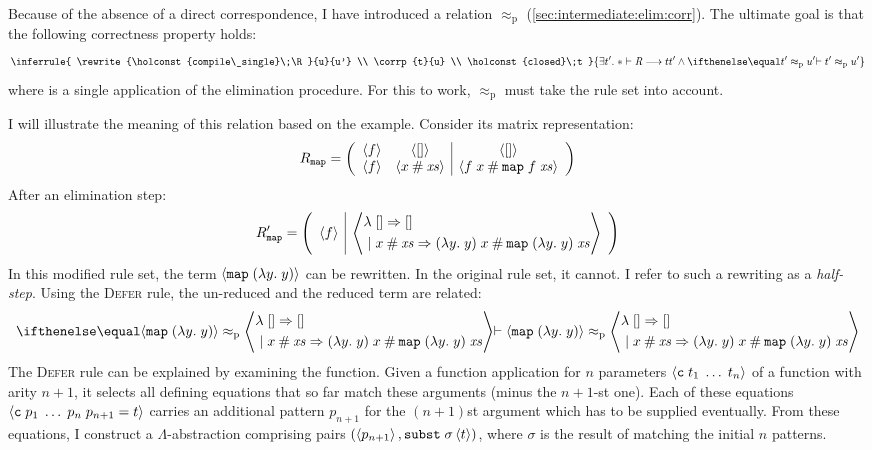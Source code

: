 Because of the absence of a direct correspondence, I have introduced a relation $\approx_\text{p}$ (\cref{sec:intermediate:elim:corr}).
The ultimate goal is that the following correctness property holds:
%
\[
  \inferrule{
    \rewrite{\holconst{compile\_single}\;\R}{u}{u'} \\
    \corrp{t}{u} \\
    \holconst{closed}\;t
  }{
    \exists t'.\;\rewrite*\R t t' \wedge \corrp{t'}{u'}
  }
\]
%
where  is a single application of the elimination procedure.
For this to work, $\approx_\text{p}$ must take the rule set into account.

I will illustrate the meaning of this relation based on the  example.
Consider its matrix representation:
\[
  R_{\texttt{\textup{map}}} =
    \left(\begin{array}{cc|c}
      \left\langle f\right\rangle & \left\langle[]\right\rangle & \left\langle[]\right\rangle \\
      \left\langle f\right\rangle & \left\langle x \mathbin{\mathtt{\#}} \mathit{xs}\right\rangle & \left\langle f\;x \mathbin{\mathtt{\#}} \texttt{\textup{map}}\;f\;\mathit{xs}\right\rangle
    \end{array}\right)
\]
%
After an elimination step:
%
\[
  R'_{\texttt{\textup{map}}} =
    \left(\begin{array}{c|c}
      \left\langle f\right\rangle &
        \left\langle\begin{aligned}
                 \lambda\; &[] \Rightarrow [] \\
                 |\;&x \mathbin{\mathtt{\#}} \mathit{xs} \Rightarrow (\lambda y.\;y)\;x \mathbin{\mathtt{\#}} \texttt{\textup{map}}\;(\lambda y.\;y)\;\mathit{xs}
               \end{aligned}\right\rangle
    \end{array}\right)
\]
%
In this modified rule set, the term $\left\langle\texttt{\textup{map}}\;(\lambda y.\;y)\right\rangle$ can be rewritten.
In the original rule set, it cannot.
I refer to such a rewriting as a \emph{half-step}.
Using the \textsc{Defer} rule, the un-reduced and the reduced term are related:
%
\[
  \corrp{
    \embed{\holconst{map}\;(\lambda y.\;y)}
  }{
    \embed{\begin{aligned}
      \lambda\; &[] \Rightarrow [] \\
      |\;&x \cons \mathit{xs} \Rightarrow (\lambda y.\;y)\;x \cons \holconst{map}\;(\lambda y.\;y)\;\mathit{xs}
    \end{aligned}}
  }
\]
%
The \textsc{Defer} rule can be explained by examining the  function.
Given a function application for $n$ parameters $\left\langle\texttt{\textup{c}}\;t_1\;\ldots\;t_n\right\rangle$ of a function with arity $n+1$, it selects all defining equations that so far match these arguments (minus the $n+1$-st one).
Each of these equations $\left\langle\texttt{\textup{c}}\;p_1\;\ldots\;p_n\;p_{n+1} = t\right\rangle$ carries an additional pattern $p_{n+1}$ for the $(n+1)$st argument which has to be supplied eventually.
From these equations, I construct a $\Lambda$-abstraction comprising pairs $(\left\langle p_{n+1}\right\rangle, \texttt{\textup{subst}}\;\sigma\left\langle t\right\rangle)$, where $\sigma$ is the result of matching the initial $n$ patterns.

